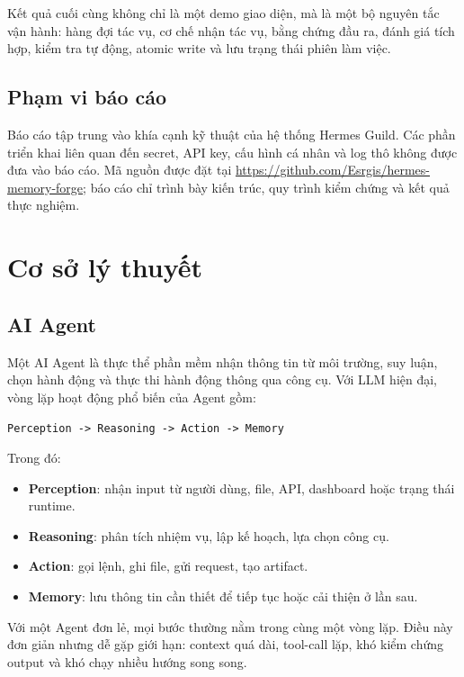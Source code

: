 \documentclass[12pt,a4paper]{article}
\begin{document}
Kết quả cuối cùng không chỉ là một demo giao diện, mà là một bộ nguyên tắc vận hành: hàng đợi tác vụ, cơ chế nhận tác vụ, bằng chứng đầu ra, đánh giá tích hợp, kiểm tra tự động, atomic write và lưu trạng thái phiên làm việc.

\subsection{Phạm vi báo cáo}

Báo cáo tập trung vào khía cạnh kỹ thuật của hệ thống Hermes Guild. Các phần triển khai liên quan đến secret, API key, cấu hình cá nhân và log thô không được đưa vào báo cáo. Mã nguồn được đặt tại \url{https://github.com/Esrgis/hermes-memory-forge}; báo cáo chỉ trình bày kiến trúc, quy trình kiểm chứng và kết quả thực nghiệm.

\section{Cơ sở lý thuyết}

\subsection{AI Agent}

Một AI Agent là thực thể phần mềm nhận thông tin từ môi trường, suy luận, chọn hành động và thực thi hành động thông qua công cụ. Với LLM hiện đại, vòng lặp hoạt động phổ biến của Agent gồm:

\begin{center}
\texttt{Perception -> Reasoning -> Action -> Memory}
\end{center}

Trong đó:

\begin{itemize}
    \item \textbf{Perception}: nhận input từ người dùng, file, API, dashboard hoặc trạng thái runtime.
    \item \textbf{Reasoning}: phân tích nhiệm vụ, lập kế hoạch, lựa chọn công cụ.
    \item \textbf{Action}: gọi lệnh, ghi file, gửi request, tạo artifact.
    \item \textbf{Memory}: lưu thông tin cần thiết để tiếp tục hoặc cải thiện ở lần sau.
\end{itemize}

Với một Agent đơn lẻ, mọi bước thường nằm trong cùng một vòng lặp. Điều này đơn giản nhưng dễ gặp giới hạn: context quá dài, tool-call lặp, khó kiểm chứng output và khó chạy nhiều hướng song song.
\end{document}
